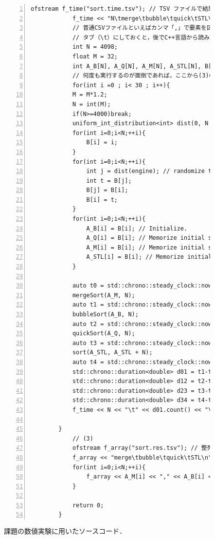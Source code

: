 \documentclass[fleqn, a4paper. 12pt]{ltjsarticle} %
\begin{document}
\begin{figure}[b]
\begin{lstlisting}[mathescape=true, numbers=left]
            ofstream f_time("sort.time.tsv"); // TSV ファイルで結果を出力する．計算時間の確認用
            f_time << "N\tmerge\tbubble\tquick\tSTL\n";
            // 普通CSVファイルといえばカンマ「,」で要素を区切るが，カンマの代わりに実はタブ\tをつかったTSVもだいたいの環境で使える．
            // タブ（\t）にしておくと，後でC++言語から読み取りやすい．
            int N = 4098;
            float M = 32;
            int A_B[N], A_Q[N], A_M[N], A_STL[N], B[N];
            // 何度も実行するのが面倒であれば，ここから(3)のあたりまでを繰り返し文とするといい．
            for(int i =0 ; i< 30 ; i++){
            M = M*1.2;
            N = int(M);
            if(N>=4000)break;
            uniform_int_distribution<int> dist(0, N - 1);
            for(int i=0;i<N;++i){
                B[i] = i;
            }
            for(int i=0;i<N;++i){
                int j = dist(engine); // randomize the state
                int t = B[j];
                B[j] = B[i];
                B[i] = t;
            }
            for(int i=0;i<N;++i){
                A_B[i] = B[i]; // Initialize.
                A_Q[i] = B[i]; // Memorize initial state.
                A_M[i] = B[i]; // Memorize initial state.
                A_STL[i] = B[i]; // Memorize initial state.
            }
        
            auto t0 = std::chrono::steady_clock::now();
            mergeSort(A_M, N);
            auto t1 = std::chrono::steady_clock::now();
            bubbleSort(A_B, N);
            auto t2 = std::chrono::steady_clock::now();
            quickSort(A_Q, N);
            auto t3 = std::chrono::steady_clock::now();
            sort(A_STL, A_STL + N);
            auto t4 = std::chrono::steady_clock::now();
            std::chrono::duration<double> d01 = t1-t0;
            std::chrono::duration<double> d12 = t2-t1;
            std::chrono::duration<double> d23 = t3-t2;
            std::chrono::duration<double> d34 = t4-t3;
            f_time << N << "\t" << d01.count() << "\t" << d12.count() << "\t" << d23.count() << "\t" << d34.count() <<"\n";
            
        }
            // (3)
            ofstream f_array("sort.res.tsv"); // 整列結果の確認用
            f_array << "merge\tbubble\tquick\tSTL\n";
            for(int i=0;i<N;++i){
                f_array << A_M[i] << "," << A_B[i] << "," << A_M[i] <<"," << A_STL[i]<< "\n";
            }
            
            return 0;
        }
      \end{lstlisting}
      \caption{課題の数値実験に用いたソースコード．}
      \label{af1}
      \end{figure}
\end{document}

